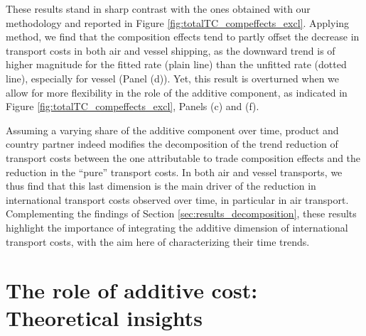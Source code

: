 \documentclass[a4paper,11pt]{article}
\begin{document}
These results stand in sharp contrast with the ones obtained with our methodology and reported in Figure \ref{fig:totalTC_compeffects_excl}.
Applying \cite{hummels2007} method, we find that the composition effects tend to partly offset the decrease in transport costs in both air and vessel shipping, as the downward trend is of higher magnitude for the fitted rate (plain line) than the unfitted rate (dotted line), especially for vessel (Panel (d)).
Yet, this result is overturned when we allow for more flexibility in the role of the additive component, as indicated in Figure \ref{fig:totalTC_compeffects_excl}, Panels (c) and (f).\medskip


Assuming a varying share of the additive component over time, product and country partner indeed modifies the decomposition of the trend reduction of transport costs between the one attributable to trade composition effects and the reduction in the ``pure'' transport costs.
In both air and vessel transports, we thus find that this last dimension is the main driver of the reduction in international transport costs observed over time, in particular in air transport.
Complementing the findings of Section \ref{sec:results_decomposition}, these results highlight the importance of integrating the additive dimension of international transport costs, with the aim here of characterizing their time trends.




\section{The role of additive cost: Theoretical insights}\label{sec:theory}
\end{document}
